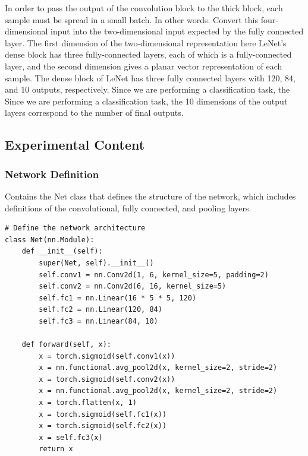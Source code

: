 \documentclass[a4paper,12pt]{article}
\begin{document}
In order to pass the output of the convolution block to the thick block, each sample must be spread in a small batch. In other words.
Convert this four-dimensional input into the two-dimensional input expected by the fully connected layer. The first dimension of the two-dimensional representation here
LeNet's dense block has three fully-connected layers, each of which is a fully-connected layer, and the second dimension gives a planar vector representation of each sample.
The dense block of LeNet has three fully connected layers with 120, 84, and 10 outputs, respectively. Since we are performing a classification task, the
Since we are performing a classification task, the 10 dimensions of the output layers correspond to the number of final outputs.

\subsection{Experimental Content}
\subsubsection{Network Definition}
Contains the Net class that defines the structure of the network, which includes definitions of the convolutional, fully connected, and pooling layers.
\begin{lstlisting}
# Define the network architecture
class Net(nn.Module):
    def __init__(self):
        super(Net, self).__init__()
        self.conv1 = nn.Conv2d(1, 6, kernel_size=5, padding=2)
        self.conv2 = nn.Conv2d(6, 16, kernel_size=5)
        self.fc1 = nn.Linear(16 * 5 * 5, 120)
        self.fc2 = nn.Linear(120, 84)
        self.fc3 = nn.Linear(84, 10)

    def forward(self, x):
        x = torch.sigmoid(self.conv1(x))
        x = nn.functional.avg_pool2d(x, kernel_size=2, stride=2)
        x = torch.sigmoid(self.conv2(x))
        x = nn.functional.avg_pool2d(x, kernel_size=2, stride=2)
        x = torch.flatten(x, 1)
        x = torch.sigmoid(self.fc1(x))
        x = torch.sigmoid(self.fc2(x))
        x = self.fc3(x)
        return x

\end{lstlisting}
\end{document}
